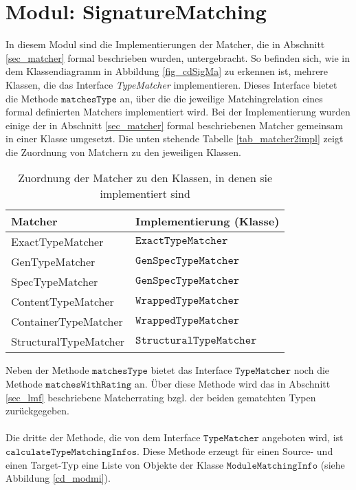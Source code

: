 \section{Modul: SignatureMatching}
In diesem Modul sind die Implementierungen der Matcher, die in Abschnitt \ref{sec_matcher} formal beschrieben wurden, untergebracht. So befinden sich, wie in dem Klassendiagramm in Abbildung \ref{fig_cdSigMa} zu erkennen ist, mehrere Klassen, die das Interface \emph{TypeMatcher} implementieren. Dieses Interface bietet die Methode $\texttt{matchesType}$ an, über die die jeweilige Matchingrelation eines formal definierten Matchers implementiert wird. Bei der Implementierung wurden einige der in Abschnitt \ref{sec_matcher} formal beschriebenen Matcher gemeinsam in einer Klasse umgesetzt. Die unten stehende Tabelle \ref{tab_matcher2impl} zeigt die Zuordnung von Matchern zu den jeweiligen Klassen.
\begin{table}[h!]
\centering
\begin{tabular}{|l|l|}
\hline
\hline
\textbf{Matcher} & \textbf{Implementierung (Klasse)} \\
\hline
ExactTypeMatcher & $\texttt{ExactTypeMatcher}$ \\
\hline
GenTypeMatcher & $\texttt{GenSpecTypeMatcher}$ \\
\hline
SpecTypeMatcher & $\texttt{GenSpecTypeMatcher}$ \\
\hline
ContentTypeMatcher & $\texttt{WrappedTypeMatcher}$ \\
\hline
ContainerTypeMatcher & $\texttt{WrappedTypeMatcher}$ \\
\hline
StructuralTypeMatcher & $\texttt{StructuralTypeMatcher}$ \\
\hline
\hline
\end{tabular}
\caption{Zuordnung der Matcher zu den Klassen, in denen sie implementiert sind}
\end{table}\label{tab_matcher2impl}
\noindent
Neben der Methode $\texttt{matchesType}$ bietet das Interface $\texttt{TypeMatcher}$ noch die Methode $\texttt{matchesWithRating}$ an. Über diese Methode wird das in Abschnitt \ref{sec_lmf} beschriebene Matcherrating bzgl. der beiden gematchten Typen zurückgegeben.
\\\\
Die dritte der Methode, die von dem Interface $\texttt{TypeMatcher}$ angeboten wird, ist $\texttt{calculateTypeMatchingInfos}$. Diese Methode erzeugt für einen Source- und einen Target-Typ eine Liste von Objekte der Klasse $\texttt{ModuleMatchingInfo}$ (siehe Abbildung \ref{cd_modmi}).
